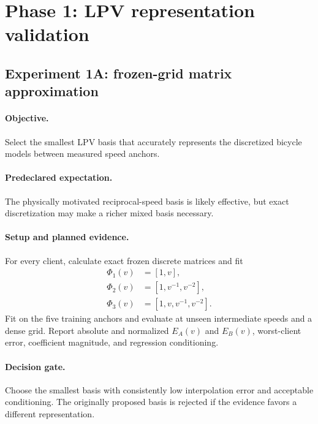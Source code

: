 \section{Phase 1: LPV representation validation}
\label{sec:phase1}

\subsection{Experiment 1A: frozen-grid matrix approximation}
\paragraph{Objective.}
Select the smallest LPV basis that accurately represents the discretized bicycle
models between measured speed anchors.

\paragraph{Predeclared expectation.}
The physically motivated reciprocal-speed basis is likely effective, but exact
discretization may make a richer mixed basis necessary.

\paragraph{Setup and planned evidence.}
For every client, calculate exact frozen discrete matrices and fit
\begin{align}
 \Phi_1(v)&=[1,v],\\
 \Phi_2(v)&=[1,v^{-1},v^{-2}],\\
 \Phi_3(v)&=[1,v,v^{-1},v^{-2}].
\end{align}
Fit on the five training anchors and evaluate at unseen intermediate speeds and a
dense grid. Report absolute and normalized $E_A(v)$ and $E_B(v)$, worst-client
error, coefficient magnitude, and regression conditioning.

\paragraph{Decision gate.}
Choose the smallest basis with consistently low interpolation error and acceptable
conditioning. The originally proposed basis is rejected if the evidence favors a
different representation.

